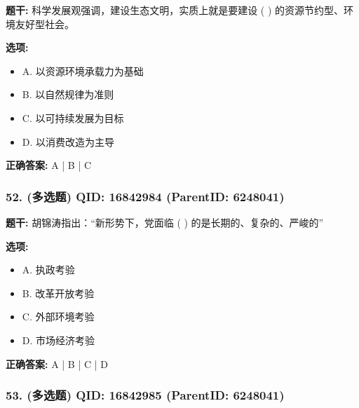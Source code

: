 \documentclass[12pt,UTF8]{ctexart}
\begin{document}
\textbf{题干:}
科学发展观强调，建设生态文明，实质上就是要建设 ( ) 的资源节约型、环境友好型社会。



\textbf{选项:}
\begin{itemize}[leftmargin=*]

  \item A. 以资源环境承载力为基础

  \item B. 以自然规律为准则

  \item C. 以可持续发展为目标

  \item D. 以消费改造为主导

\end{itemize}

\textbf{正确答案:}
A | B | C

\vspace{0.3em}\hrulefill\vspace{0.7em}

\subsubsection*{52. (多选题) \small QID: 16842984 (ParentID: 6248041)}

\textbf{题干:}
胡锦涛指出：“新形势下，党面临 ( ) 的是长期的、复杂的、严峻的”



\textbf{选项:}
\begin{itemize}[leftmargin=*]

  \item A. 执政考验

  \item B. 改革开放考验

  \item C. 外部环境考验

  \item D. 市场经济考验

\end{itemize}

\textbf{正确答案:}
A | B | C | D

\vspace{0.3em}\hrulefill\vspace{0.7em}

\subsubsection*{53. (多选题) \small QID: 16842985 (ParentID: 6248041)}
\end{document}
